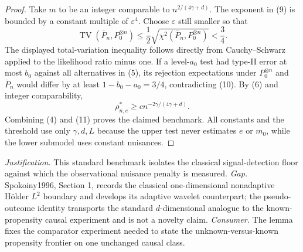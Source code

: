 \documentclass{article}
\begin{document}
\begin{proof}
Take \(m\) to be an integer comparable to \(n^{2/(4\gamma+d)}\). The exponent in (9) is bounded by a constant multiple of \(\varepsilon^4\). Choose \(\varepsilon\) still smaller so that
\[
 \operatorname{TV}(\overline P_n,P_0^{\otimes n})
 \le\frac12\sqrt{\chi^2(\overline P_n,P_0^{\otimes n})}<\frac34.    \tag{10}
\]
The displayed total-variation inequality follows directly from Cauchy--Schwarz applied to the likelihood ratio minus one. If a level-\(a_0\) test had type-II error at most \(b_0\) against all alternatives in (5), its rejection expectations under \(P_0^{\otimes n}\) and \(\overline P_n\) would differ by at least \(1-b_0-a_0=3/4\), contradicting (10). By (6) and integer comparability,
\[
 \rho_{n,e}^*\ge c n^{-2\gamma/(4\gamma+d)}.                          \tag{11}
\]
Combining (4) and (11) proves the claimed benchmark. All constants and the threshold use only \(\gamma,d,L\) because the upper test never estimates \(e\) or \(m_0\), while the lower submodel uses constant nuisances.
\end{proof}
\par\smallskip\noindent \textit{Justification.} This standard benchmark isolates the classical signal-detection floor against which the observational nuisance penalty is measured. \textit{Gap.} Spokoiny1996, Section 1, records the classical one-dimensional nonadaptive Hölder \(L^2\) boundary and develops its adaptive wavelet counterpart; the pseudo-outcome identity transports the standard \(d\)-dimensional analogue to the known-propensity causal experiment and is not a novelty claim. \textit{Consumer.} The lemma fixes the comparator experiment needed to state the unknown-versus-known propensity frontier on one unchanged causal class.
\end{document}
